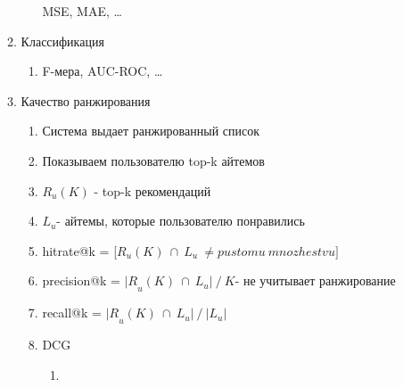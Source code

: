 \documentclass[a4paper, 12pt]{article}
\begin{document}
\begin{enumerate}
\begin{enumerate}
\begin{enumerate}
      MSE, MAE, \ldots{}
      
    \end{enumerate}
  \item
    
    Классификация
    

    \begin{enumerate}
    \def\labelenumiii{\roman{enumiii}.}
    \item
      
      F-мера, AUC-ROC, \ldots{}
      
    \end{enumerate}
  \item
    
    Качество ранжирования
    

    \begin{enumerate}
    \def\labelenumiii{\roman{enumiii}.}
    \item
      
      Система выдает ранжированный список
      
    \item
      
      Показываем пользователю top-k айтемов
      
    \item
      
      \(R_{u}(K)\) - top-k рекомендаций
      
    \item
      
      \(L_{u}\)- айтемы, которые пользователю понравились
      
    \item
      
      hitrate@k =
      {[}\(R_{u}(K)\  \cap \ L_{u}\  \neq pustomu\ mnozhestvu\rbrack\)
      
    \item
      
      precision@k = \({|R}_{u}(K)\  \cap \ L_{u}|\ /\ K\)- не учитывает
      ранжирование
      
    \item
      
      recall@k = \({|R}_{u}(K)\  \cap \ L_{u}|\ /\ |L_{u}|\)
      
    \item
      
      DCG
      

      \begin{enumerate}
      \def\labelenumiv{\arabic{enumiv}.}
      \item
        

\end{enumerate}
\end{enumerate}
\end{enumerate}
\end{enumerate}
\end{document}
